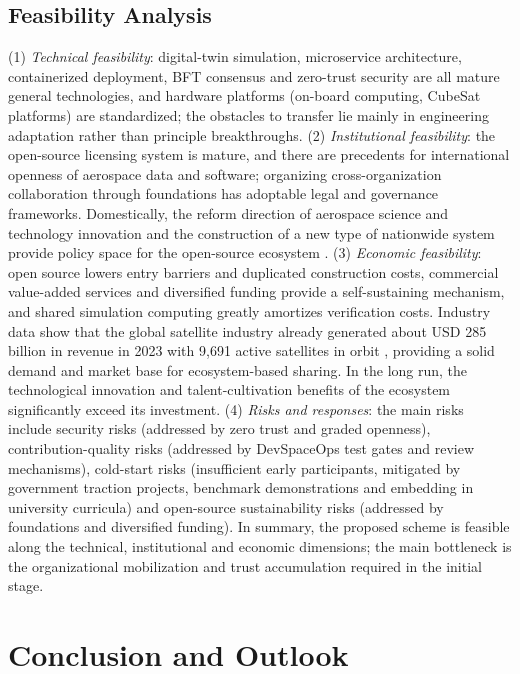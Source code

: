 \documentclass[11pt]{article}
\begin{document}
\subsection{Feasibility Analysis}
(1) \emph{Technical feasibility}: digital-twin simulation, microservice architecture, containerized deployment, BFT consensus and zero-trust security are all mature general technologies, and hardware platforms (on-board computing, CubeSat platforms) are standardized; the obstacles to transfer lie mainly in engineering adaptation rather than principle breakthroughs. (2) \emph{Institutional feasibility}: the open-source licensing system is mature, and there are precedents for international openness of aerospace data and software; organizing cross-organization collaboration through foundations has adoptable legal and governance frameworks. Domestically, the reform direction of aerospace science and technology innovation and the construction of a new type of nationwide system provide policy space for the open-source ecosystem \cite{white2021}. (3) \emph{Economic feasibility}: open source lowers entry barriers and duplicated construction costs, commercial value-added services and diversified funding provide a self-sustaining mechanism, and shared simulation computing greatly amortizes verification costs. Industry data show that the global satellite industry already generated about USD 285 billion in revenue in 2023 with 9,691 active satellites in orbit \cite{sia2024}, providing a solid demand and market base for ecosystem-based sharing. In the long run, the technological innovation and talent-cultivation benefits of the ecosystem significantly exceed its investment. (4) \emph{Risks and responses}: the main risks include security risks (addressed by zero trust and graded openness), contribution-quality risks (addressed by DevSpaceOps test gates and review mechanisms), cold-start risks (insufficient early participants, mitigated by government traction projects, benchmark demonstrations and embedding in university curricula) and open-source sustainability risks (addressed by foundations and diversified funding). In summary, the proposed scheme is feasible along the technical, institutional and economic dimensions; the main bottleneck is the organizational mobilization and trust accumulation required in the initial stage.

\section{Conclusion and Outlook}
\end{document}
